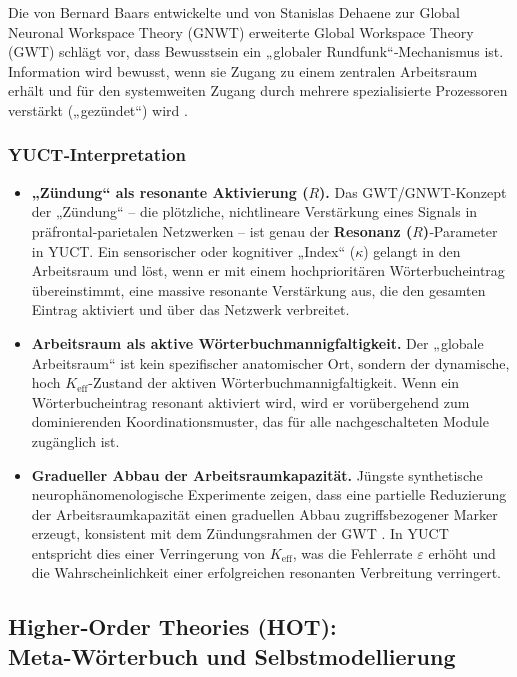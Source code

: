 \documentclass[12pt,a4paper]{article}
\begin{document}
	Die von Bernard Baars entwickelte und von Stanislas Dehaene zur Global Neuronal Workspace Theory (GNWT) erweiterte Global Workspace Theory (GWT) schlägt vor, dass Bewusstsein ein „globaler Rundfunk“‑Mechanismus ist. Information wird bewusst, wenn sie Zugang zu einem zentralen Arbeitsraum erhält und für den systemweiten Zugang durch mehrere spezialisierte Prozessoren verstärkt („gezündet“) wird \cite{Baars1988, Dehaene2014}.
	
	\subsubsection*{YUCT‑Interpretation}
	\begin{itemize}
		\item \textbf{„Zündung“ als resonante Aktivierung (\(R\)).} Das GWT/GNWT‑Konzept der „Zündung“ – die plötzliche, nichtlineare Verstärkung eines Signals in präfrontal‑parietalen Netzwerken – ist genau der \textbf{Resonanz (\(R\))}‑Parameter in YUCT. Ein sensorischer oder kognitiver „Index“ (\(\kappa\)) gelangt in den Arbeitsraum und löst, wenn er mit einem hochprioritären Wörterbucheintrag übereinstimmt, eine massive resonante Verstärkung aus, die den gesamten Eintrag aktiviert und über das Netzwerk verbreitet.
		\item \textbf{Arbeitsraum als aktive Wörterbuchmannigfaltigkeit.} Der „globale Arbeitsraum“ ist kein spezifischer anatomischer Ort, sondern der dynamische, hoch \(K_{\mathrm{eff}}\)-Zustand der aktiven Wörterbuchmannigfaltigkeit. Wenn ein Wörterbucheintrag resonant aktiviert wird, wird er vorübergehend zum dominierenden Koordinationsmuster, das für alle nachgeschalteten Module zugänglich ist.
		\item \textbf{Gradueller Abbau der Arbeitsraumkapazität.} Jüngste synthetische neurophänomenologische Experimente zeigen, dass eine partielle Reduzierung der Arbeitsraumkapazität einen graduellen Abbau zugriffsbezogener Marker erzeugt, konsistent mit dem Zündungsrahmen der GWT \cite{Phua2026}. In YUCT entspricht dies einer Verringerung von \(K_{\mathrm{eff}}\), was die Fehlerrate \(\varepsilon\) erhöht und die Wahrscheinlichkeit einer erfolgreichen resonanten Verbreitung verringert.
	\end{itemize}
	
	\subsection{Higher‑Order Theories (HOT): Meta‑Wörterbuch und Selbstmodellierung}
	
\end{document}
